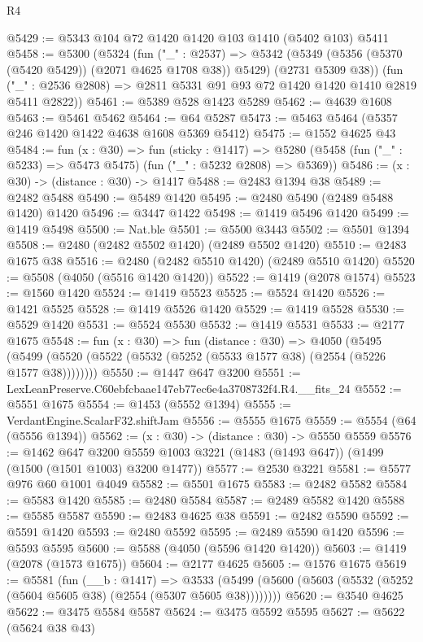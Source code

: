 \begin{lexlean}{R4}
\begin{coremodule}
@5429 := @5343 @104 @72 @1420 @1420 @103 @1410 (@5402 @103) @5411
@5458 := @5300
    (@5324
      (fun ("_" : @2537) =>
      @5342 (@5349 (@5356 (@5370 (@5420 @5429)) (@2071 @4625 @1708 @38)) @5429) (@2731 @5309 @38))
      (fun ("_" : @2536 @2808) => @2811 @5331 @91 @93 @72 @1420 @1420 @1410 @2819 @5411 @2822))
@5461 := @5389 @528 @1423 @5289
@5462 := @4639 @1608
@5463 := @5461 @5462
@5464 := @64 @5287
@5473 := @5463 @5464 (@5357 @246 @1420 @1422 @4638 @1608 @5369 @5412)
@5475 := @1552 @4625 @43
@5484 := fun (x : @30) =>
  fun (sticky : @1417) =>
  @5280 (@5458 (fun ("_" : @5233) => @5473 @5475) (fun ("_" : @5232 @2808) => @5369))
@5486 := (x : @30) -> (distance : @30) -> @1417
@5488 := @2483 @1394 @38
@5489 := @2482 @5488
@5490 := @5489 @1420
@5495 := @2480 @5490 (@2489 @5488 @1420) @1420
@5496 := @3447 @1422
@5498 := @1419 @5496 @1420
@5499 := @1419 @5498
@5500 := Nat.ble
@5501 := @5500 @3443
@5502 := @5501 @1394
@5508 := @2480 (@2482 @5502 @1420) (@2489 @5502 @1420)
@5510 := @2483 @1675 @38
@5516 := @2480 (@2482 @5510 @1420) (@2489 @5510 @1420)
@5520 := @5508 (@4050 (@5516 @1420 @1420))
@5522 := @1419 (@2078 @1574)
@5523 := @1560 @1420
@5524 := @1419 @5523
@5525 := @5524 @1420
@5526 := @1421 @5525
@5528 := @1419 @5526 @1420
@5529 := @1419 @5528
@5530 := @5529 @1420
@5531 := @5524 @5530
@5532 := @1419 @5531
@5533 := @2177 @1675
@5548 := fun (x : @30) =>
  fun (distance : @30) =>
  @4050 (@5495 (@5499 (@5520 (@5522 (@5532 (@5252 (@5533 @1577 @38) (@2554 (@5226 @1577 @38))))))))
@5550 := @1447 @647 @3200
@5551 := LexLeanPreserve.C60ebfcbaae147eb77ec6e4a3708732f4.R4.__fits_24
@5552 := @5551 @1675
@5554 := @1453 (@5552 @1394)
@5555 := VerdantEngine.ScalarF32.shiftJam
@5556 := @5555 @1675
@5559 := @5554 (@64 (@5556 @1394))
@5562 := (x : @30) -> (distance : @30) -> @5550 @5559
@5576 := @1462
    @647
    @3200
    @5559
    @1003
    @3221
    (@1483 (@1493 @647))
    (@1499 (@1500 (@1501 @1003) @3200 @1477))
@5577 := @2530 @3221
@5581 := @5577 @976 @60 @1001 @4049
@5582 := @5501 @1675
@5583 := @2482 @5582
@5584 := @5583 @1420
@5585 := @2480 @5584
@5587 := @2489 @5582 @1420
@5588 := @5585 @5587
@5590 := @2483 @4625 @38
@5591 := @2482 @5590
@5592 := @5591 @1420
@5593 := @2480 @5592
@5595 := @2489 @5590 @1420
@5596 := @5593 @5595
@5600 := @5588 (@4050 (@5596 @1420 @1420))
@5603 := @1419 (@2078 (@1573 @1675))
@5604 := @2177 @4625
@5605 := @1576 @1675
@5619 := @5581
    (fun (__b : @1417) =>
    @3533 (@5499 (@5600 (@5603 (@5532 (@5252 (@5604 @5605 @38) (@2554 (@5307 @5605 @38))))))))
@5620 := @3540 @4625
@5622 := @3475 @5584 @5587
@5624 := @3475 @5592 @5595
@5627 := @5622 (@5624 @38 @43)

\end{coremodule}
\end{lexlean}
